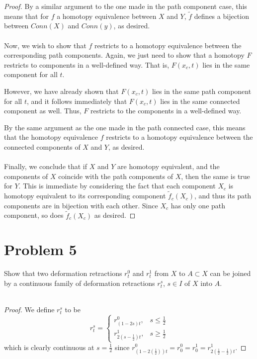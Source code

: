 \documentclass[fontsize=11pt]{scrartcl} %
\numberwithin{equation}{section} %
\numberwithin{figure}{section} %
\numberwithin{table}{section} %
\begin{document}
\begin{proof}
    By a similar argument to the one made in the path component case, this means
    that for $f$ a homotopy equivalence between $X$ and $Y$, $\tilde{f}$ defines
    a bijection between $Conn(X)$ and $Conn(y)$, as desired.
    \\
    \\
    Now, we wish to show that $f$ restricts to a homotopy equivalence between
    the corresponding path components. Again, we just need to show that a
    homotopy $F$ restricts to components in a well-defined way. That is,
    $F(x_c,t)$ lies in the same component for all $t$.

    However, we have already shown that $F(x_c,t)$ lies in the same path
    component for all $t$, and it follows immediately that $F(x_c,t)$ lies in
    the same connected component as well. Thus, $F$ restricts to the components
    in a well-defined way.

    By the same argument as the one made in the path connected case, this means
    that the homotopy equivalence $f$ restricts to a homotopy equivalence
    between the connected components of $X$ and $Y$, as desired.
    \\
    \\
    Finally, we conclude that if $X$ and $Y$ are homotopy equivalent, and the
    components of $X$ coincide with the path components of $X$, then the same is
    true for $Y$. This is immediate by considering the fact that each component
    $X_c$ is homotopy equivalent to its corresponding component
    $\tilde{f}_c(X_c)$, and thus its path components are in bijection with each
    other. Since $X_c$ has only one path component, so does $\tilde{f}_c(X_c)$
    as desired.
\end{proof}

\section*{Problem 5}
Show that two deformation retractions $r^0_t$ and $r^1_t$ from $X$ to $A\subset
X$ can be joined by a continuous family of deformation retractions $r^s_t$,
$s\in I$ of $X$ into $A$.
\\
\\
\begin{proof}
    We define $r_t^s$ to be
    \[
        r^s_t = 
        \begin{cases}
            r^0_{(1-2s)t}, &s\leq \frac{1}{2}\\
            r^1_{2(s-\frac{1}{2})t}, &s\geq \frac{1}{2}
        \end{cases}
    \]
    which is clearly continuous at $s=\frac{1}{2}$ since
    $r^0_{(1-2(\frac{1}{2}))t} = r^0_0 = r^1_0 =
    r^1_{2(\frac{1}{2}-\frac{1}{2})t}$.
\end{proof}
\end{document}
